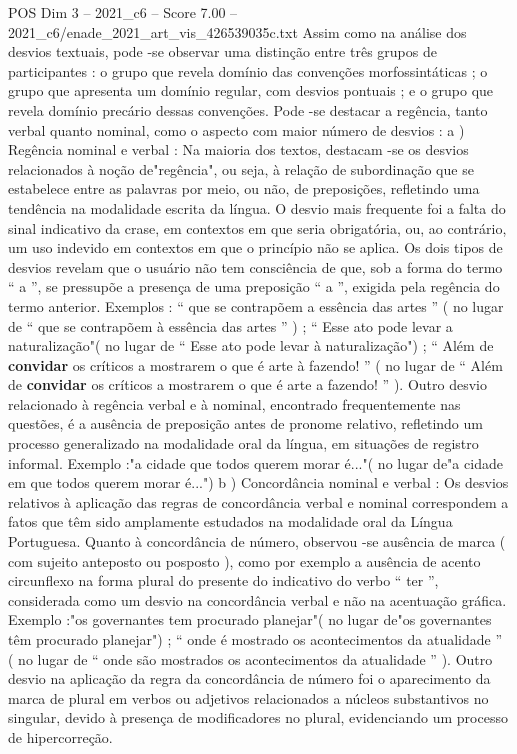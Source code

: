 \begin{textsample}{POS Dim 3 – 2021\_c6 – Score 7.00 – 2021\_c6/enade\_2021\_art\_vis\_426539035c.txt}
Assim como na análise dos desvios textuais, pode -se observar uma distinção entre três grupos de participantes : o grupo que revela domínio das convenções morfossintáticas ; o grupo que apresenta um domínio regular, com desvios pontuais ; e o grupo que revela domínio precário dessas convenções.
Pode -se destacar a regência, tanto verbal quanto nominal, como o aspecto com maior número de desvios : a ) Regência nominal e verbal : Na maioria dos textos, destacam -se os desvios relacionados à noção de"regência", ou seja, à relação de subordinação que se estabelece entre as palavras por meio, ou não, de preposições, refletindo uma tendência na modalidade escrita da língua.
O desvio mais frequente foi a falta do sinal indicativo da crase, em contextos em que seria obrigatória, ou, ao contrário, um uso indevido em contextos em que o princípio não se aplica.
Os dois tipos de desvios revelam que o usuário não tem consciência de que, sob a forma do termo “ a ”, se pressupõe a presença de uma preposição “ a ”, exigida pela regência do termo anterior.
Exemplos : “ que se contrapõem a essência das artes ” ( no lugar de “ que se contrapõem à essência das artes ” ) ; “ Esse ato pode levar a naturalização"( no lugar de “ Esse ato pode levar à naturalização") ; “ Além de \textbf{convidar} os críticos a mostrarem o que é arte à fazendo! ” ( no lugar de “ Além de \textbf{convidar} os críticos a mostrarem o que é arte a fazendo! ” ).
Outro desvio relacionado à regência verbal e à nominal, encontrado frequentemente nas questões, é a ausência de preposição antes de pronome relativo, refletindo um processo generalizado na modalidade oral da língua, em situações de registro informal.
Exemplo :"a cidade que todos querem morar é..."( no lugar de"a cidade em que todos querem morar é...") b ) Concordância nominal e verbal : Os desvios relativos à aplicação das regras de concordância verbal e nominal correspondem a fatos que têm sido amplamente estudados na modalidade oral da Língua Portuguesa.
Quanto à concordância de número, observou -se ausência de marca ( com sujeito anteposto ou posposto ), como por exemplo a ausência de acento circunflexo na forma plural do presente do indicativo do verbo “ ter ”, considerada como um desvio na concordância verbal e não na acentuação gráfica.
Exemplo :"os governantes tem procurado planejar"( no lugar de"os governantes têm procurado planejar") ; “ onde é mostrado os acontecimentos da atualidade ” ( no lugar de “ onde são mostrados os acontecimentos da atualidade ” ).
Outro desvio na aplicação da regra da concordância de número foi o aparecimento da marca de plural em verbos ou adjetivos relacionados a núcleos substantivos no singular, devido à presença de modificadores no plural, evidenciando um processo de hipercorreção.

\end{textsample}
